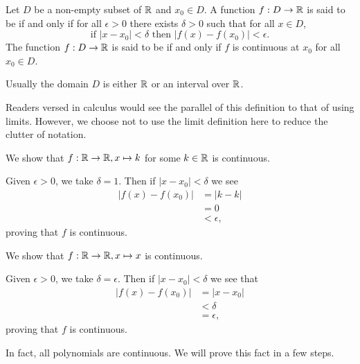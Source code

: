 \begin{definition}
    Let $D$ be a non-empty subset of $\mathbb{R}$ and $x_0 \in D$. A function $f: D \to \mathbb{R}$ is said to be  if and only if for all $\epsilon > 0$ there exists $\delta > 0$ such that for all $x \in D$,
    \[
        \text{if } |x - x_0| < \delta \text{ then } |f(x) - f(x_0)| < \epsilon.
    \]
    The function $f: D \to \mathbb{R}$ is said to be  if and only if $f$ is continuous at $x_0$ for all $x_0 \in D$.
\end{definition}
\begin{remark}
    Usually the domain $D$ is either $\mathbb{R}$ or an interval over $\mathbb{R}$.
\end{remark}

Readers versed in calculus would see the parallel of this definition to that of using limits. However, we choose not to use the limit definition here to reduce the clutter of notation.

\begin{example}\label{example-constant-function-is-continuous}
    We show that $f: \mathbb{R} \to \mathbb{R}, x \mapsto k$ for some $k \in \mathbb{R}$ is continuous.

    Given $\epsilon > 0$, we take $\delta = 1$. Then if $|x - x_0| < \delta$ we see
    \begin{align*}
        |f(x) - f(x_0)| &= |k - k|\\
        &= 0\\
        &< \epsilon,
    \end{align*}
    proving that $f$ is continuous.
\end{example}

\begin{example}\label{example-identity-polynomial-is-continuous}
    We show that $f: \mathbb{R} \to \mathbb{R}, x \mapsto x$ is continuous.

    Given $\epsilon > 0$, we take $\delta = \epsilon$. Then if $|x - x_0| < \delta$ we see that
    \begin{align*}
        |f(x) - f(x_0)| &= |x - x_0|\\
        &< \delta\\
        &= \epsilon,
    \end{align*}
    proving that $f$ is continuous.
\end{example}

In fact, all polynomials are continuous. We will prove this fact in a few steps.

